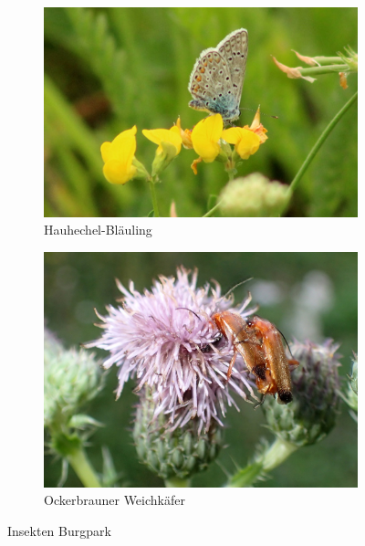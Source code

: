 \documentclass[10pt]{article}
\begin{document}
\begin{figure}[h!]
\begin{subfigure}[b]{0.48\linewidth}
    \includegraphics[width=\linewidth]{img/blaeuling.jpg}
    \caption{Hauhechel-Bläuling}
  \end{subfigure}
  \begin{subfigure}[b]{0.43\linewidth}
    \includegraphics[width=\linewidth]{img/weichkaefer.jpg}
    \caption{Ockerbrauner Weichkäfer}
  \end{subfigure}
  \caption{Insekten Burgpark}
\end{figure}

\newpage
\end{document}
